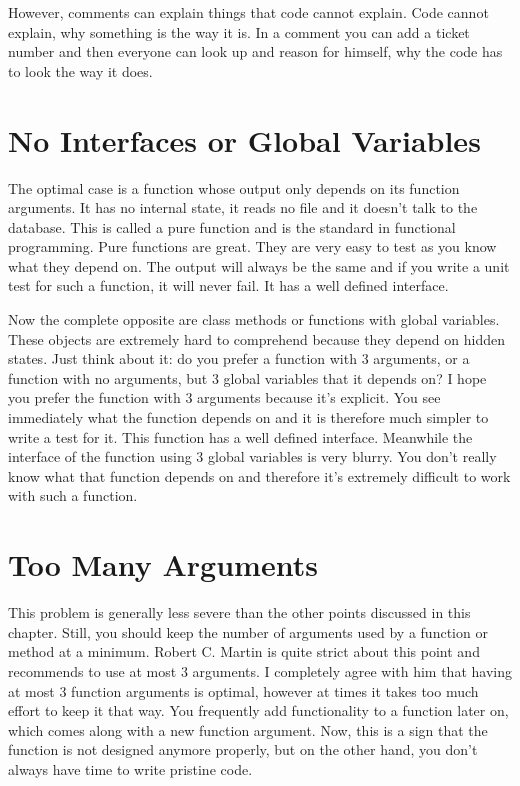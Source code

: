 However, comments can explain things that code cannot explain. Code cannot explain, why something is the way it is. In a comment you can add a ticket number and then everyone can look up and reason for himself, why the code has to look the way it does.

\section{No Interfaces or Global Variables}

The optimal case is a function whose output only depends on its function arguments. It has no internal state, it reads no file and it doesn't talk to the database. This is called a pure function and is the standard in functional programming. Pure functions are great. They are very easy to test as you know what they depend on. The output will always be the same and if you write a unit test for such a function, it will never fail. It has a well defined interface.

Now the complete opposite are class methods or functions with global variables. These objects are extremely hard to comprehend because they depend on hidden states. Just think about it: do you prefer a function with 3 arguments, or a function with no arguments, but 3 global variables that it depends on? I hope you prefer the function with 3 arguments because it's explicit. You see immediately what the function depends on and it is therefore much simpler to write a test for it. This function has a well defined interface. Meanwhile the interface of the function using 3 global variables is very blurry. You don't really know what that function depends on and therefore it's extremely difficult to work with such a function.

\section{Too Many Arguments}

This problem is generally less severe than the other points discussed in this chapter. Still, you should keep the number of arguments used by a function or method at a minimum. Robert C. Martin is quite strict about this point and recommends to use at most 3 arguments. I completely agree with him that having at most 3 function arguments is optimal, however at times it takes too much effort to keep it that way. You frequently add functionality to a function later on, which comes along with a new function argument. Now, this is a sign that the function is not designed anymore properly, but on the other hand, you don't always have time to write pristine code.

